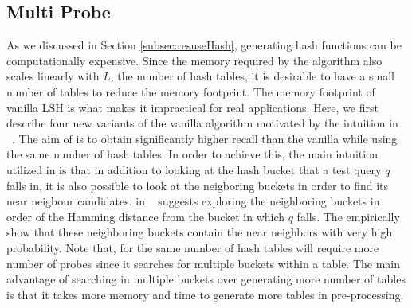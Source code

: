 \subsection{Multi Probe \lsh}
\label{sec:mblsh}
As we discussed in Section \ref{subsec:resuseHash}, generating hash functions can be computationally expensive.
Since the memory required by the algorithm also scales linearly with $L$, the number of hash tables, it is desirable to have a small 
number of tables to reduce the memory footprint. The memory footprint of vanilla LSH is what makes it impractical for real applications. 
Here, we first describe four new variants of the vanilla \lsh algorithm motivated by the intuition in
\mblshf~\cite{LvVLDB07}. The aim of \mblshf is to obtain significantly higher recall than the vanilla \lsh while using
the same number of hash tables. In order to achieve this, the main intuition utilized in \mblshf is that
in addition to looking at the hash bucket that a test query $q$ falls in, it is also possible to look at the neigboring buckets
in order to find its near neigbour candidates. \mblshf in ~\cite{LvVLDB07} suggests exploring the neighboring buckets in order of the
Hamming distance from the bucket in which $q$ falls. The empirically show that these neighboring buckets contain the near neighbors with
very high probability. 
Note that, for the same number of hash tables \mblshf will require more number of probes since it searches for multiple buckets within a table. 
The main advantage of searching in multiple buckets over generating more number of tables 
is that it takes more memory and time to generate more tables in pre-processing. 


